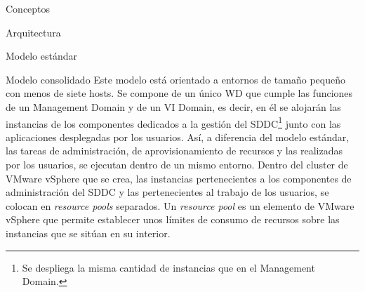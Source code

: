 \begin{section}{Conceptos}
\begin{subsection}{Arquitectura}
\begin{subsubsection}{Modelo estándar}
\FloatBarrier
\end{subsubsection}
\begin{subsubsection}{Modelo consolidado}
Este modelo está orientado a entornos de tamaño pequeño con menos de siete hosts. Se compone de un único WD que cumple las funciones de un Management Domain y de un VI Domain, es decir, en él se alojarán las instancias de los componentes dedicados a la gestión del SDDC\footnote{Se despliega la misma cantidad de instancias que en el Management Domain.} junto con las aplicaciones desplegadas por los usuarios. Así, a diferencia del modelo estándar, las tareas de administración, de aprovisionamiento de recursos y las realizadas por los usuarios, se ejecutan dentro de un mismo entorno. 
Dentro del cluster de VMware vSphere que se crea, las instancias pertenecientes a los componentes de administración del SDDC y las pertenecientes al trabajo de los usuarios, se colocan en \textit{resource pools} separados. Un \textit{resource pool} es un elemento de VMware vSphere que permite establecer unos límites de consumo de recursos sobre las instancias que se sitúan en su interior\cite{resourcePool}.



\end{subsubsection}
\end{subsection}
\end{section}
